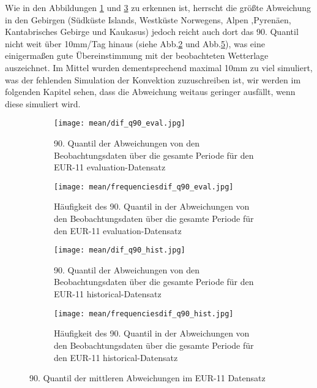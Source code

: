 Wie in den Abbildungen \ref{fig:q90_dif_eval} und \ref{fig:q90_dif_hist} zu erkennen ist, herrscht die größte Abweichung in den Gebirgen (Südküste Islands, Westküste Norwegens, Alpen ,Pyrenäen, Kantabrisches Gebirge und Kaukasus) jedoch reicht auch dort das 90. Quantil nicht weit über 10mm/Tag hinaus (siehe Abb.\ref{fig:q90_freq_dif_eval} und Abb.\ref{fig:q90_freq_dif_hist}), was eine einigermaßen gute Übereinstimmung mit der beobachteten Wetterlage auszeichnet. Im Mittel wurden dementsprechend maximal 10mm zu viel simuliert, was der fehlenden Simulation der Konvektion zuzuschreiben ist, wir werden im folgenden Kapitel sehen, dass die Abweichung weitaus geringer ausfällt, wenn diese simuliert wird. \\
\begin{figure}[hbt!]
	\begin{subfigure}{0.49\textwidth}
		\centering
		\texttt{[image: mean/dif\_q90\_eval.jpg]}
		\caption{90. Quantil der Abweichungen von den Beobachtungsdaten über die gesamte Periode für den EUR-11 evaluation-Datensatz}
		\label{fig:q90_dif_eval}
	\end{subfigure}
	\begin{subfigure}{0.49\textwidth}
		\centering
		\texttt{[image: mean/frequenciesdif\_q90\_eval.jpg]}
		\caption{Häufigkeit des 90. Quantil in der Abweichungen von den Beobachtungsdaten über die gesamte Periode für den EUR-11 evaluation-Datensatz}
		\label{fig:q90_freq_dif_eval}
	\end{subfigure}
	\begin{subfigure}{0.49\textwidth}
		\centering
		\texttt{[image: mean/dif\_q90\_hist.jpg]}
		\caption{90. Quantil der Abweichungen von den Beobachtungsdaten über die gesamte Periode für den EUR-11 historical-Datensatz}
		\label{fig:q90_dif_hist}
	\end{subfigure}
	\begin{subfigure}{0.49\textwidth}
		\centering
		\texttt{[image: mean/frequenciesdif\_q90\_hist.jpg]}
		\caption{Häufigkeit des 90. Quantil in der Abweichungen von den Beobachtungsdaten über die gesamte Periode für den EUR-11 historical-Datensatz}
		\label{fig:q90_freq_dif_hist}
	\end{subfigure}
	\caption{90. Quantil der mittleren Abweichungen im EUR-11 Datensatz}
\end{figure}
\\
\pagebreak

